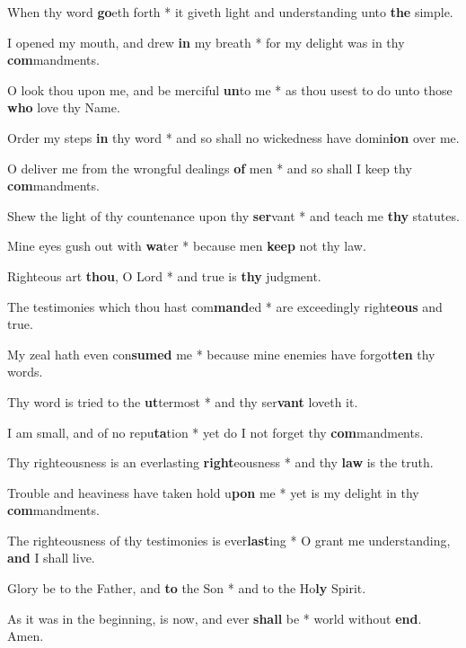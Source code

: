 \begin{multicols}{2}
	When thy word \textbf{go}eth forth * it giveth light and understanding unto \textbf{the} simple.
	
	I opened my mouth, and drew \textbf{in} my breath * for my delight was in thy \textbf{com}mandments.
	
	O look thou upon me, and be merciful \textbf{un}to me * as thou usest to do unto those \textbf{who} love thy Name.
	
	Order my steps \textbf{in} thy word * and so shall no wickedness have domin\textbf{ion} over me.
	
	O deliver me from the wrongful dealings \textbf{of} men * and so shall I keep thy \textbf{com}mandments.
	
	Shew the light of thy countenance upon thy \textbf{ser}vant * and teach me \textbf{thy} statutes.
	
	Mine eyes gush out with \textbf{wa}ter * because men \textbf{keep} not thy law.
	
	Righteous art \textbf{thou}, O Lord * and true is \textbf{thy} judgment.
	
	The testimonies which thou hast com\textbf{mand}ed * are exceedingly right\textbf{eous} and true.
	
	My zeal hath even con\textbf{sumed} me * because mine enemies have forgot\textbf{ten} thy words.
	
	Thy word is tried to the \textbf{ut}termost * and thy ser\textbf{vant} loveth it.
	
	I am small, and of no repu\textbf{ta}tion * yet do I not forget thy \textbf{com}mandments.
	
	Thy righteousness is an everlasting \textbf{right}eousness * and thy \textbf{law} is the truth.
	
	Trouble and heaviness have taken hold u\textbf{pon} me * yet is my delight in thy \textbf{com}mandments.
	
	The righteousness of thy testimonies is ever\textbf{last}ing * O grant me understanding, \textbf{and} I shall live.
	
	Glory be to the Father, and \textbf{to} the Son * and to the Ho\textbf{ly} Spirit.
	
	As it was in the beginning, is now, and ever \textbf{shall} be * world without \textbf{end}. Amen.
\end{multicols}
